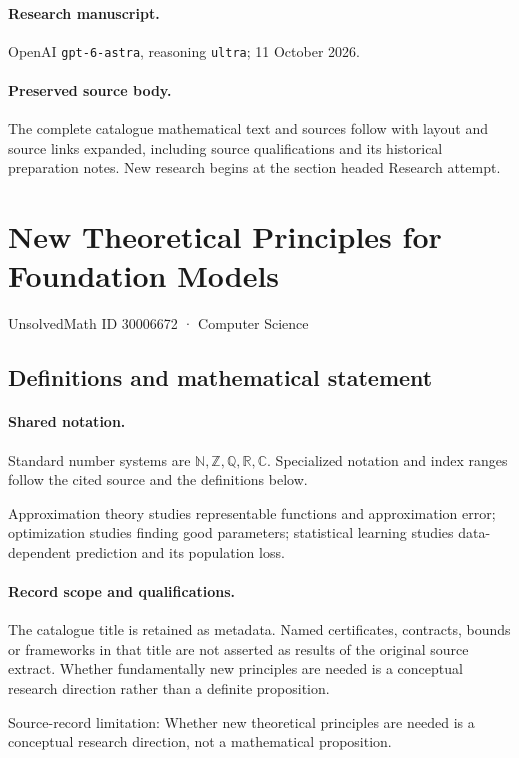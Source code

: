 \documentclass[11pt]{article}
\begin{document}
\paragraph{Research manuscript.} OpenAI \texttt{gpt-6-astra}, reasoning \texttt{ultra}; 11 October 2026.
\paragraph{Preserved source body.} The complete catalogue mathematical text and sources follow with layout and source links expanded, including source qualifications and its historical preparation notes. New research begins at the section headed Research attempt.

\section{New Theoretical Principles for Foundation Models}\label{30006672}
{\small UnsolvedMath ID 30006672 · Computer Science}
\subsection{Definitions and mathematical statement}

\paragraph{Shared notation.}Standard number systems are $\mathbb N,\mathbb Z,\mathbb Q,\mathbb R,\mathbb C$. Specialized notation and index ranges follow the cited source and the definitions below.


Approximation theory studies representable functions and approximation error; optimization studies finding good parameters; statistical learning studies data-dependent prediction and its population loss.
\paragraph{Record scope and qualifications.}
The catalogue title is retained as metadata. Named certificates, contracts, bounds or frameworks in that title are not asserted as results of the original source extract.
Whether fundamentally new principles are needed is a conceptual research direction rather than a definite proposition.

Source-record limitation: Whether new theoretical principles are needed is a conceptual research direction, not a mathematical proposition.
\end{document}
